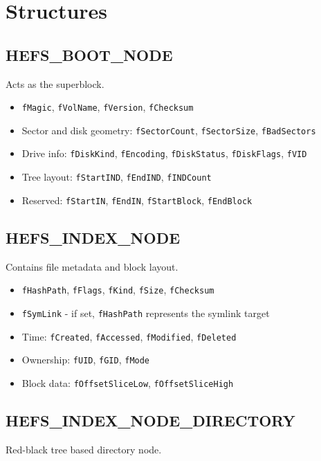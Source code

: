 \documentclass{article}
\begin{document}
\section{Structures}\label{sec:structures}

\subsection{HEFS\_BOOT\_NODE}\label{subsec:hefs_boot_node}
Acts as the superblock.

\begin{itemize}
  \item \texttt{fMagic}, \texttt{fVolName}, \texttt{fVersion}, \texttt{fChecksum}
  \item Sector and disk geometry: \texttt{fSectorCount}, \texttt{fSectorSize}, \texttt{fBadSectors}
  \item Drive info: \texttt{fDiskKind}, \texttt{fEncoding}, \texttt{fDiskStatus}, \texttt{fDiskFlags}, \texttt{fVID}
  \item Tree layout: \texttt{fStartIND}, \texttt{fEndIND}, \texttt{fINDCount}
  \item Reserved: \texttt{fStartIN}, \texttt{fEndIN}, \texttt{fStartBlock}, \texttt{fEndBlock}
\end{itemize}

\subsection{HEFS\_INDEX\_NODE}\label{subsec:hefs_index_node}
Contains file metadata and block layout.

\begin{itemize}
  \item \texttt{fHashPath}, \texttt{fFlags}, \texttt{fKind}, \texttt{fSize}, \texttt{fChecksum}
  \item \texttt{fSymLink} - if set, \texttt{fHashPath} represents the symlink target
  \item Time: \texttt{fCreated}, \texttt{fAccessed}, \texttt{fModified}, \texttt{fDeleted}
  \item Ownership: \texttt{fUID}, \texttt{fGID}, \texttt{fMode}
  \item Block data: \texttt{fOffsetSliceLow}, \texttt{fOffsetSliceHigh}
\end{itemize}

\subsection{HEFS\_INDEX\_NODE\_DIRECTORY}\label{subsec:hefs_index_node_directory}
Red-black tree based directory node.
\end{document}
